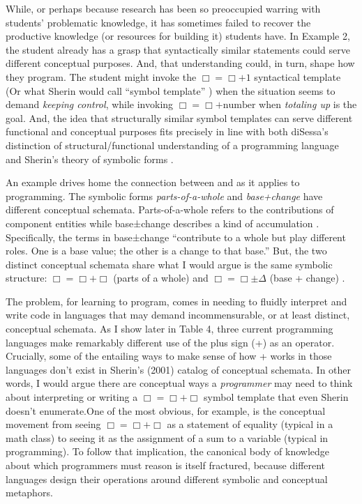 While, or perhaps because
research has been so preoccupied warring with students' problematic
knowledge, it has sometimes failed to recover the productive knowledge
(or resources for building it) students have. In Example 2, the
student already has a grasp that syntactically similar statements could
serve different conceptual purposes. And, that understanding could, in turn, shape how they program. The student might
invoke the $\Box=︎ \Box + 1$ syntactical
template (Or what Sherin would call ``symbol template'' \cite{sherin_how_2001}) when the situation seems to demand \emph{keeping control},
while invoking $\Box= ︎\Box + \mathrm{number}$ when \emph{totaling up} is the goal.
And, the idea that structurally similar symbol templates can serve
different functional and conceptual purposes fits precisely in line with both diSessa's distinction of structural/functional understanding of a programming language \cite{disessa_models_1986} and
Sherin's theory of symbolic forms \cite{sherin_how_2001}.

An example drives home the connection between \cite{disessa_models_1986} and \cite{sherin_how_2001} as it applies to programming. The symbolic
forms \emph{parts-of-a-whole} and \emph{base+change} have different
conceptual schemata. Parts-of-a-whole refers to the contributions of
component entities while base±change describes a kind of accumulation \cite{sherin_how_2001}.
Specifically, the terms in base±change ``contribute to a whole but play different roles. One is a base value; the other is a change to that base.'' But, the two distinct conceptual schemata share what I
would argue is the same symbolic structure: $\Box=︎ \Box + \Box$ (parts of a whole) and $\Box = \Box \pm \Delta$ (base + change) \cite{sherin_how_2001}.

The problem, for learning to program, comes in needing to fluidly
interpret and write code in languages that may demand incommensurable,
or at least distinct, conceptual schemata. As I show later in Table 4,
three current programming languages make remarkably different use of the
plus sign (+) as an operator. Crucially, some of the entailing ways to
make sense of how + works in those languages don't exist in Sherin's
(2001) catalog of conceptual schemata. In other words, I would argue
there are conceptual ways a \emph{programmer} may need to think about
interpreting or writing a $\Box=︎ \Box +\Box$ symbol template that even Sherin \cite{sherin_how_2001} doesn't
enumerate.One of the most obvious, for example, is the conceptual movement from seeing
  $\Box=︎ \Box +\Box$ as a statement of equality (typical in a math class) to seeing it as the assignment of a
  sum to a variable (typical in programming). To follow that implication, the canonical body of
knowledge about which programmers must reason is itself fractured,
because different languages design their operations around different
symbolic and conceptual metaphors.

